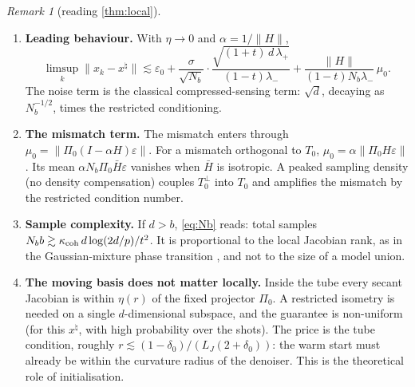 \documentclass[11pt]{article}
\theoremstyle{definition}
\theoremstyle{remark}
\newtheorem{remark}[theorem]{Remark}
\newcommand{\norm}[1]{\lVert #1\rVert}
\newcommand{\Hb}{\bar H}
\newcommand{\xt}{x^\natural}
\begin{document}
\begin{remark}[reading \cref{thm:local}]\label{rem:local}
\begin{enumerate}
\item \textbf{Leading behaviour.} With $\eta\to0$ and $\alpha=1/\norm H$,
  \[
  \limsup_k\norm{x_k-\xt}\lesssim\varepsilon_0+\frac{\sigma}{\sqrt{N_b}}\cdot\frac{\sqrt{(1+t)\,d\,\lambda_+}}{(1-t)\lambda_-}+\frac{\norm H}{(1-t)N_b\lambda_-}\,\mu_0 .
  \]
  The noise term is the classical compressed-sensing term: $\sqrt d$, decaying as $N_b^{-1/2}$, times the restricted
  conditioning.
\item \textbf{The mismatch term.} The mismatch enters through $\mu_0=\norm{\Pi_0(I-\alpha H)\varepsilon}$. For a
  mismatch orthogonal to $T_0$, $\mu_0=\alpha\norm{\Pi_0H\varepsilon}$. Its mean $\alpha N_b\Pi_0\Hb\varepsilon$
  vanishes when $\Hb$ is isotropic. A peaked sampling density (no density compensation) couples $T_0^\perp$ into
  $T_0$ and amplifies the mismatch by the restricted condition number.
\item \textbf{Sample complexity.} If $d>b$, \eqref{eq:Nb} reads: total samples
  $N_bb\gtrsim\kappa_{\rm coh}\,d\log(2d/p)/t^2$. It is proportional to the local Jacobian rank, as in the
  Gaussian-mixture phase transition \cite{renna2014gmm}, and not to the size of a model union.
\item \textbf{The moving basis does not matter locally.} Inside the tube every secant Jacobian is within
  $\eta(r)$ of the fixed projector $\Pi_0$. A restricted isometry is needed on a single $d$-dimensional subspace,
  and the guarantee is non-uniform (for this $\xt$, with high probability over the shots). The price is the
  tube condition, roughly $r\lesssim(1-\delta_0)/(L_J(2+\delta_0))$: the warm start must already be within the
  curvature radius of the denoiser. This is the theoretical role of initialisation.
\end{enumerate}
\end{remark}
\end{document}
